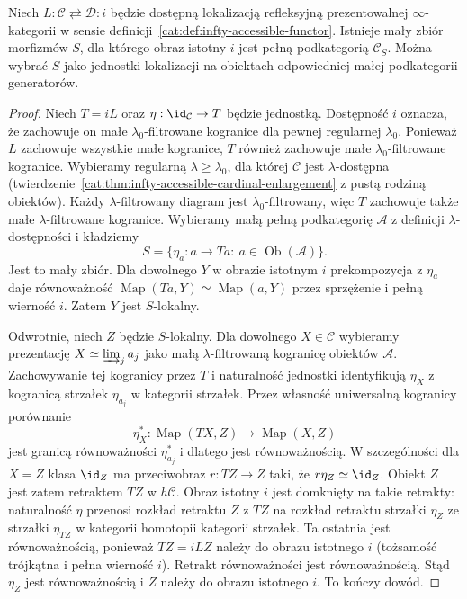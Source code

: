 \begin{stwierdzenie}\label{cat:prop:infty-bousfield-small-generation}
Niech $L:\mathcal C\rightleftarrows\mathcal D:i$ będzie dostępną lokalizacją refleksyjną prezentowalnej $\infty$-kategorii w sensie definicji~\ref{cat:def:infty-accessible-functor}. Istnieje mały zbiór morfizmów $S$, dla którego obraz istotny $i$ jest pełną podkategorią $\mathcal C_S$. Można wybrać $S$ jako jednostki lokalizacji na obiektach odpowiedniej małej podkategorii generatorów.
\end{stwierdzenie}
\begin{proof}
Niech $T=iL$ oraz $\eta:\id_{\mathcal C}\to T$ będzie jednostką. Dostępność $i$ oznacza, że zachowuje on małe $\lambda_0$-filtrowane kogranice dla pewnej regularnej $\lambda_0$. Ponieważ $L$ zachowuje wszystkie małe kogranice, $T$ również zachowuje małe $\lambda_0$-filtrowane kogranice. Wybieramy regularną $\lambda\geq\lambda_0$, dla której $\mathcal C$ jest $\lambda$-dostępna (twierdzenie~\ref{cat:thm:infty-accessible-cardinal-enlargement} z pustą rodziną obiektów). Każdy $\lambda$-filtrowany diagram jest $\lambda_0$-filtrowany, więc $T$ zachowuje także małe $\lambda$-filtrowane kogranice. Wybieramy małą pełną podkategorię $\mathcal A$ z definicji $\lambda$-dostępności i kładziemy
\[
 S=\{\eta_a:a\to Ta:\ a\in\operatorname{Ob}(\mathcal A)\}.
\]
Jest to mały zbiór. Dla dowolnego $Y$ w obrazie istotnym $i$ prekompozycja z $\eta_a$ daje równoważność $\operatorname{Map}(Ta,Y)\simeq\operatorname{Map}(a,Y)$ przez sprzężenie i pełną wierność $i$. Zatem $Y$ jest $S$-lokalny.

Odwrotnie, niech $Z$ będzie $S$-lokalny. Dla dowolnego $X\in\mathcal C$ wybieramy prezentację $X\simeq\varinjlim_j a_j$ jako małą $\lambda$-filtrowaną kogranicę obiektów $\mathcal A$. Zachowywanie tej kogranicy przez $T$ i naturalność jednostki identyfikują $\eta_X$ z kogranicą strzałek $\eta_{a_j}$ w kategorii strzałek. Przez własność uniwersalną kogranicy porównanie
\[
 \eta_X^*:\operatorname{Map}(TX,Z)\longrightarrow\operatorname{Map}(X,Z)
\]
jest granicą równoważności $\eta_{a_j}^*$ i dlatego jest równoważnością. W szczególności dla $X=Z$ klasa $\id_Z$ ma przeciwobraz $r:TZ\to Z$ taki, że $r\eta_Z\simeq\id_Z$. Obiekt $Z$ jest zatem retraktem $TZ$ w $h\mathcal C$. Obraz istotny $i$ jest domknięty na takie retrakty: naturalność $\eta$ przenosi rozkład retraktu $Z$ z $TZ$ na rozkład retraktu strzałki $\eta_Z$ ze strzałki $\eta_{TZ}$ w kategorii homotopii kategorii strzałek. Ta ostatnia jest równoważnością, ponieważ $TZ=iLZ$ należy do obrazu istotnego $i$ (tożsamość trójkątna i pełna wierność $i$). Retrakt równoważności jest równoważnością. Stąd $\eta_Z$ jest równoważnością i $Z$ należy do obrazu istotnego $i$. To kończy dowód.
\end{proof}

